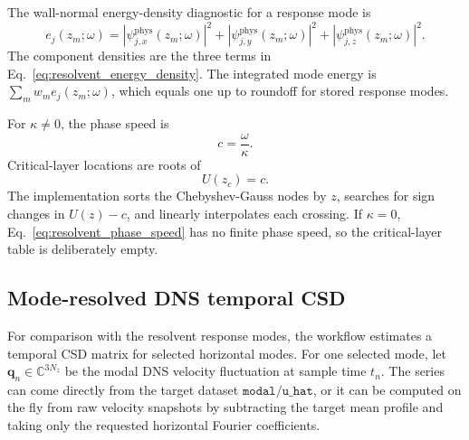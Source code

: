 \documentclass[11pt]{article}
\newcommand{\bfq}{\bm{q}}
\begin{document}
The wall-normal energy-density diagnostic for a response mode is
\begin{equation}
  e_j(z_m;\omega)
  =
  \left|\psi_{j,x}^{\mathrm{phys}}(z_m;\omega)\right|^2
  +
  \left|\psi_{j,y}^{\mathrm{phys}}(z_m;\omega)\right|^2
  +
  \left|\psi_{j,z}^{\mathrm{phys}}(z_m;\omega)\right|^2.
  \label{eq:resolvent_energy_density}
\end{equation}
The component densities are the three terms in
Eq.~\eqref{eq:resolvent_energy_density}. The integrated mode energy is
\(\sum_m w_m e_j(z_m;\omega)\), which equals one up to roundoff for stored
response modes.

For \(\kappa\neq0\), the phase speed is
\begin{equation}
  c=\frac{\omega}{\kappa}.
  \label{eq:resolvent_phase_speed}
\end{equation}
Critical-layer locations are roots of
\begin{equation}
  U(z_c)=c.
  \label{eq:resolvent_critical_layer}
\end{equation}
The implementation sorts the Chebyshev-Gauss nodes by \(z\), searches for
sign changes in \(U(z)-c\), and linearly interpolates each crossing. If
\(\kappa=0\), Eq.~\eqref{eq:resolvent_phase_speed} has no finite phase speed,
so the critical-layer table is deliberately empty.

\subsection{Mode-resolved DNS temporal CSD}

For comparison with the resolvent response modes, the workflow estimates a
temporal CSD matrix for selected horizontal modes. For one selected mode, let
\(\bfq_n\in\mathbb{C}^{3N_z}\) be the modal DNS velocity fluctuation at
sample time \(t_n\). The series can come directly from the target dataset
\(\texttt{modal/u\_hat}\), or it can be computed on the fly from raw velocity
snapshots by subtracting the target mean profile and taking only the requested
horizontal Fourier coefficients.
\end{document}
